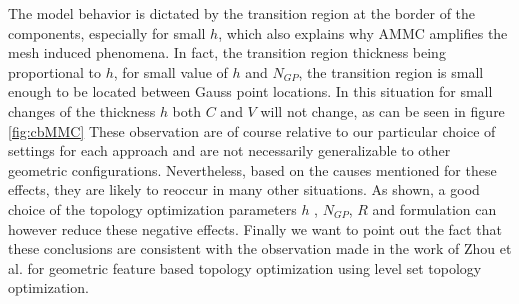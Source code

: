 The model behavior is dictated by the transition region at the border of the components, especially for small $h$, which also explains why AMMC amplifies the mesh induced phenomena. In fact, the transition region thickness being proportional to $h$, for small value of $h$ and $N_{GP}$, the transition region is small enough to be located between Gauss point locations. In this situation for small changes of the thickness $h$ both $C$ and $V$ will not change, as can be seen in figure \ref{fig:cbMMC}
These observation are of course relative to our particular choice of settings for each approach and are not necessarily  generalizable to other geometric configurations. Nevertheless, based on the causes mentioned for these effects, they are likely to reoccur in many other situations. As shown, a good choice of the topology optimization parameters  $h$ , $N_{GP}$, $R$ and formulation can however reduce these negative effects.
 Finally we want to point out the fact that these conclusions are consistent with the observation made in the work of Zhou et al. \cite{zhou2016feature} for geometric feature based topology optimization using level set topology optimization.
